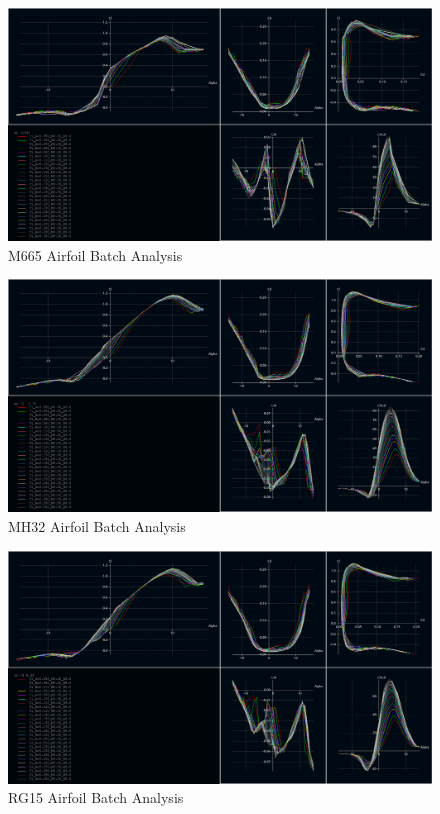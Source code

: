 \documentclass[]{article}
\begin{document}
\begin{figure}[H]
\includegraphics[scale=0.4]{m665_batch}
\caption{M665 Airfoil Batch Analysis}
\end{figure}

\begin{figure}[H]
\includegraphics[scale=0.4]{mh32_batch}
\caption{MH32 Airfoil Batch Analysis}
\end{figure}

\begin{figure}[H]
\includegraphics[scale=0.4]{rg15_batch}
\caption{RG15 Airfoil Batch Analysis}
\end{figure}
\end{document}
